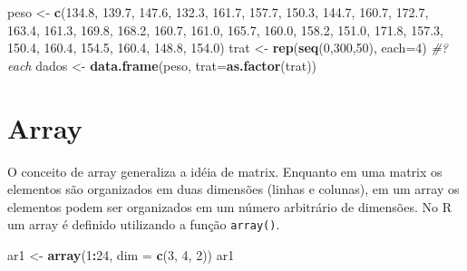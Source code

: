 \documentclass[]{book}
\newenvironment{Shaded}{\begin{snugshade}}{\end{snugshade}}
\newcommand{\CommentTok}[1]{\textcolor[rgb]{0.56,0.35,0.01}{\textit{#1}}}
\newcommand{\DataTypeTok}[1]{\textcolor[rgb]{0.13,0.29,0.53}{#1}}
\newcommand{\DecValTok}[1]{\textcolor[rgb]{0.00,0.00,0.81}{#1}}
\newcommand{\FloatTok}[1]{\textcolor[rgb]{0.00,0.00,0.81}{#1}}
\newcommand{\KeywordTok}[1]{\textcolor[rgb]{0.13,0.29,0.53}{\textbf{#1}}}
\newcommand{\NormalTok}[1]{#1}
\newcommand{\OperatorTok}[1]{\textcolor[rgb]{0.81,0.36,0.00}{\textbf{#1}}}
\newcommand{\StringTok}[1]{\textcolor[rgb]{0.31,0.60,0.02}{#1}}
\begin{document}
\begin{Shaded}
\begin{Highlighting}[]
\NormalTok{peso  <-}\StringTok{ }\KeywordTok{c}\NormalTok{(}\FloatTok{134.8}\NormalTok{, }\FloatTok{139.7}\NormalTok{, }\FloatTok{147.6}\NormalTok{, }\FloatTok{132.3}\NormalTok{, }\FloatTok{161.7}\NormalTok{, }\FloatTok{157.7}\NormalTok{, }\FloatTok{150.3}\NormalTok{, }\FloatTok{144.7}\NormalTok{,}
           \FloatTok{160.7}\NormalTok{, }\FloatTok{172.7}\NormalTok{, }\FloatTok{163.4}\NormalTok{, }\FloatTok{161.3}\NormalTok{, }\FloatTok{169.8}\NormalTok{, }\FloatTok{168.2}\NormalTok{, }\FloatTok{160.7}\NormalTok{, }\FloatTok{161.0}\NormalTok{,}
           \FloatTok{165.7}\NormalTok{, }\FloatTok{160.0}\NormalTok{, }\FloatTok{158.2}\NormalTok{, }\FloatTok{151.0}\NormalTok{, }\FloatTok{171.8}\NormalTok{, }\FloatTok{157.3}\NormalTok{, }\FloatTok{150.4}\NormalTok{, }\FloatTok{160.4}\NormalTok{,}
           \FloatTok{154.5}\NormalTok{, }\FloatTok{160.4}\NormalTok{, }\FloatTok{148.8}\NormalTok{, }\FloatTok{154.0}\NormalTok{)}
\NormalTok{trat  <-}\StringTok{ }\KeywordTok{rep}\NormalTok{(}\KeywordTok{seq}\NormalTok{(}\DecValTok{0}\NormalTok{,}\DecValTok{300}\NormalTok{,}\DecValTok{50}\NormalTok{), }\DataTypeTok{each=}\DecValTok{4}\NormalTok{)  }\CommentTok{#?each}
\NormalTok{dados <-}\StringTok{  }\KeywordTok{data.frame}\NormalTok{(peso, }\DataTypeTok{trat=}\KeywordTok{as.factor}\NormalTok{(trat))}
\end{Highlighting}
\end{Shaded}

\hypertarget{array}{%
\section{Array}\label{array}}

O conceito de array generaliza a idéia de matrix. Enquanto em uma matrix os elementos são organizados em duas dimensões (linhas e colunas), em um array os elementos podem ser organizados em um número arbitrário de dimensões.
No R um array é definido utilizando a função \texttt{array()}.

\begin{Shaded}
\begin{Highlighting}[]
\NormalTok{ar1 <-}\StringTok{ }\KeywordTok{array}\NormalTok{(}\DecValTok{1}\OperatorTok{:}\DecValTok{24}\NormalTok{, }\DataTypeTok{dim =} \KeywordTok{c}\NormalTok{(}\DecValTok{3}\NormalTok{, }\DecValTok{4}\NormalTok{, }\DecValTok{2}\NormalTok{)) }
\NormalTok{ar1}
\end{Highlighting}
\end{Shaded}
\end{document}
